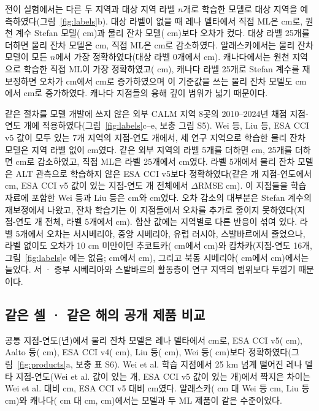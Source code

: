 전이 실험에서는 다른 두 지역과 대상 지역 라벨 $n$개로 학습한 모델로 대상 지역을 예측하였다(그림~\ref{fig:labels}b). 대상 라벨이 없을 때 레나 델타에서 직접 ML은 \ntlrmseLeDszero{} cm로, 원천 계수 Stefan 모델(\ntlrmseLePzzero{} cm)과 물리 잔차 모델(\ntlrmseLeRszero{} cm)보다 오차가 컸다. 대상 라벨 25개를 더하면 물리 잔차 모델은 \ntlrmseLeRstwfive{} cm, 직접 ML은 \ntlrmseLeDstwfive{} cm로 감소하였다. 알래스카에서는 물리 잔차 모델이 모든 $n$에서 가장 정확하였다(대상 라벨 0개에서 \ntlrmseAkRszero{} cm). 캐나다에서는 원천 지역으로 학습한 직접 ML이 가장 정확하였고(\ntlrmseCaDszero{} cm), 캐나다 라벨 25개로 Stefan 계수를 재보정하면 오차가 \ntlrmseCaPzzero{} cm에서 \ntlrmseCaPntwfive{} cm로 증가하였으며 이 기준값을 쓰는 물리 잔차 모델도 \ntlrmseCaRszero{} cm에서 \ntlrmseCaRstwfive{} cm로 증가하였다. 캐나다 지점들의 융해 깊이 범위가 넓기 때문이다.

같은 절차를 모델 개발에 쓰지 않은 외부 CALM 지역 8곳의 2010--2024년 채점 지점-연도 \nftScoredRows{}개에 적용하였다(그림~\ref{fig:labels}c--e, 보충 그림 S5). Wei 등, Liu 등, ESA CCI v5 값이 모두 있는 7개 지역의 지점-연도 \nftrows{}개에서, 세 연구 지역으로 학습한 물리 잔차 모델은 지역 라벨 없이 \nftAllRszero{} cm였다. 같은 외부 지역의 라벨 5개를 더하면 \nftAllRsfive{} cm, 25개를 더하면 \nftAllRstwfive{} cm로 감소하였고, 직접 ML은 라벨 25개에서 \nftAllDstwfive{} cm였다. 라벨 5개에서 물리 잔차 모델은 ALT 관측으로 학습하지 않은 ESA CCI v5보다 정확하였다(같은 \nftrows{}개 지점-연도에서 \nftAllCcifivezero{} cm, ESA CCI v5 값이 있는 지점-연도 \nftdCciRows{}개 전체에서 $\Delta$RMSE \nftdRsCcifivefive{} cm). 이 지점들을 학습 자료에 포함한 Wei 등과 Liu 등은 \nftAllWeizero{} cm와 \nftAllLiuzero{} cm였다. 오차 감소의 대부분은 Stefan 계수의 재보정에서 나왔고, 잔차 학습기는 이 지점들에서 오차를 추가로 줄이지 못하였다(지점-연도 \nftScoredRows{}개 전체, 라벨 5개에서 \nftdRsPnfive{} cm). 합산 값에는 지역별로 다른 반응이 섞여 있다. 라벨 5개에서 오차는 서시베리아, 중앙 시베리아, 유럽 러시아, 스발바르에서 줄었으나, 라벨 없이도 오차가 10 cm 미만이던 추코트카(\nftChRszero{} cm에서 \nftChRsfive{} cm)와 캄차카(지점-연도 16개, 그림~\ref{fig:labels}e 에는 없음; \nftKaRszero{} cm에서 \nftKaRsfive{} cm), 그리고 북동 시베리아(\nftNsRszero{} cm에서 \nftNsRsfive{} cm)에서는 늘었다. 서 · 중부 시베리아와 스발바르의 활동층이 연구 지역의 범위보다 두껍기 때문이다.

\subsection{같은 셀 · 같은 해의 공개 제품 비교}
공통 지점-연도(\nyrscc{}년)에서 물리 잔차 모델은 레나 델타에서 \nccLeRoall{} cm로, ESA CCI v5(\nccLeCcifiveall{} cm), Aalto 등(\nccLeAaltoall{} cm), ESA CCI v4(\nccLeCcifourall{} cm), Liu 등(\nccLeLiuall{} cm), Wei 등(\nccLeWeiall{} cm)보다 정확하였다(그림~\ref{fig:products}a, 보충 표 S6). Wei et al. 학습 지점에서 25 km 넘게 떨어진 레나 델타 지점-연도(Wei et al. 값이 있는 \nnprodLeweimask{}개, ESA CCI v5 값이 있는 \nnprodLeccifivemask{}개)에서 짝지은 차이는 Wei et al. 대비 \ndprodLeweiRomask{} cm, ESA CCI v5 대비 \ndprodLeccifiveRomask{} cm였다. 알래스카(\nccAkRoall{} cm 대 Wei 등 \nccAkWeiall{} cm, Liu 등 \nccAkLiuall{} cm)와 캐나다(\nccCaRoall{} cm 대 \nccCaWeiall{} cm, \nccCaLiuall{} cm)에서는 모델과 두 ML 제품이 같은 수준이었다.

